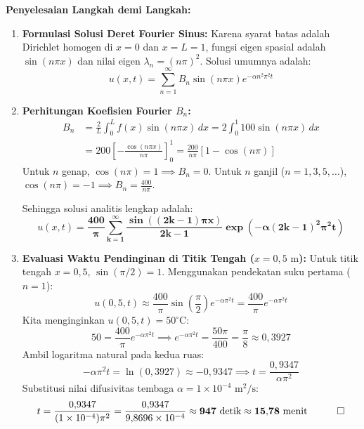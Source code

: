 \documentclass[11pt,a4paper]{article}
\theoremstyle{definition}
\begin{document}
\noindent\textbf{Penyelesaian Langkah demi Langkah:}
\begin{enumerate}[leftmargin=*]
    \item \textbf{Formulasi Solusi Deret Fourier Sinus:}
    Karena syarat batas adalah Dirichlet homogen di $x=0$ dan $x=L=1$, fungsi eigen spasial adalah $\sin(n\pi x)$ dan nilai eigen $\lambda_n = (n\pi)^2$. Solusi umumnya adalah:
    \begin{equation*}
        u(x, t) = \sum_{n=1}^{\infty} B_n \sin(n\pi x) e^{-\alpha n^2 \pi^2 t}
    \end{equation*}
    
    \item \textbf{Perhitungan Koefisien Fourier $B_n$:}
    \begin{align*}
        B_n &= \frac{2}{L} \int_{0}^{L} f(x) \sin(n\pi x) \, dx = 2 \int_{0}^{1} 100 \sin(n\pi x) \, dx \\
            &= 200 \left[ -\frac{\cos(n\pi x)}{n\pi} \right]_{0}^{1} = \frac{200}{n\pi} [1 - \cos(n\pi)]
    \end{align*}
    Untuk $n$ genap, $\cos(n\pi) = 1 \implies B_n = 0$.
    Untuk $n$ ganjil ($n = 1, 3, 5, \dots$), $\cos(n\pi) = -1 \implies B_n = \frac{400}{n\pi}$.
    
    Sehingga solusi analitis lengkap adalah:
    \begin{equation*}
        u(x, t) = \mathbf{\frac{400}{\pi} \sum_{k=1}^{\infty} \frac{\sin((2k-1)\pi x)}{2k-1} \exp\left( -\alpha (2k-1)^2 \pi^2 t \right)}
    \end{equation*}
    
    \item \textbf{Evaluasi Waktu Pendinginan di Titik Tengah ($x = 0{,}5\text{ m}$):}
    Untuk titik tengah $x = 0{,}5$, $\sin(\pi / 2) = 1$. Menggunakan pendekatan suku pertama ($n = 1$):
    \begin{equation*}
        u(0{,}5, t) \approx \frac{400}{\pi} \sin\left(\frac{\pi}{2}\right) e^{-\alpha \pi^2 t} = \frac{400}{\pi} e^{-\alpha \pi^2 t}
    \end{equation*}
    Kita menginginkan $u(0{,}5, t) = 50^\circ\text{C}$:
    \begin{equation*}
        50 = \frac{400}{\pi} e^{-\alpha \pi^2 t} \implies e^{-\alpha \pi^2 t} = \frac{50 \pi}{400} = \frac{\pi}{8} \approx 0{,}3927
    \end{equation*}
    Ambil logaritma natural pada kedua ruas:
    \begin{equation*}
        -\alpha \pi^2 t = \ln(0{,}3927) \approx -0{,}9347 \implies t = \frac{0{,}9347}{\alpha \pi^2}
    \end{equation*}
    Substitusi nilai difusivitas tembaga $\alpha = 1 \times 10^{-4}\text{ m}^2/\text{s}$:
    \begin{equation*}
        t = \frac{0{,}9347}{(1 \times 10^{-4}) \pi^2} = \frac{0{,}9347}{9{,}8696 \times 10^{-4}} \approx \mathbf{947\text{ detik}} \approx \mathbf{15{,}78\text{ menit}} \quad \qed
    \end{equation*}
\end{enumerate}
\end{document}
